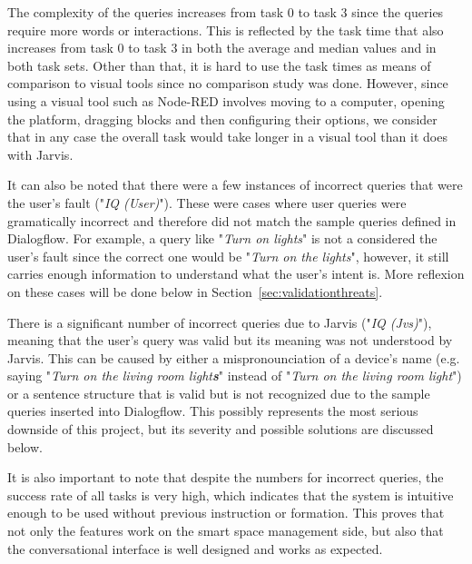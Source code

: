 \documentclass[runningheads]{llncs}
\begin{document}
The complexity of the queries increases from task 0 to task 3 since the queries require more words or interactions. This is reflected by the task time that also increases from task 0 to task 3 in both the average and median values and in both task sets. Other than that, it is hard to use the task times as means of comparison to visual tools since no comparison study was done. However, since using a visual tool such as Node-RED involves moving to a computer, opening the platform, dragging blocks and then configuring their options, we consider that in any case the overall task would take longer in a visual tool than it does with Jarvis.


It can also be noted that there were a few instances of incorrect queries that were the user's fault ("\textit{IQ (User)}"). These were cases where user queries were gramatically incorrect and therefore did not match the sample queries defined in Dialogflow. For example, a query like "\textit{Turn on lights}" is not a considered the user's fault since the correct one would be "\textit{Turn on the lights}", however, it still carries enough information to understand what the user's intent is. More reflexion on these cases will be done below in Section~\ref{sec:validationthreats}.

There is a significant number of incorrect queries due to Jarvis ("\textit{IQ (Jvs)}"), meaning that the user's query was valid but its meaning was not understood by Jarvis. This can be caused by either a mispronounciation of a device's name (e.g. saying "\textit{Turn on the living room light\textbf{s}}" instead of "\textit{Turn on the living room light}") or a sentence structure that is valid but is not recognized due to the sample queries inserted into Dialogflow. This possibly represents the most serious downside of this project, but its severity and possible solutions are discussed below.

It is also important to note that despite the numbers for incorrect queries, the success rate of all tasks is very high, which indicates that the system is intuitive enough to be used without previous instruction or formation. This proves that not only the features work on the smart space management side, but also that the conversational interface is well designed and works as expected.
\end{document}
